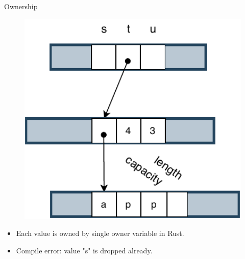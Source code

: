 \documentclass[9pt]{beamer}
\begin{document}
\begin{frame}[t, fragile]{Ownership}
\begin{minipage}{0.3\linewidth}
\begin{figure}[hp]
            \end{figure}
        \end{minipage}     
        \begin{minipage}{0.3\linewidth}
            \begin{figure}[hp]
                \centering
                \begin{center}
                        \includegraphics[width=1.0\textwidth]{images/owner2.pdf}
                        \captionsetup{labelformat=empty}
                \end{center}
                
            \end{figure}
        \end{minipage}
                

        \vspace{0.5cm}
        \begin{itemize}
            \item Each value is owned by single owner variable in Rust.
            \item Compile error: value "s" is dropped already.
        \end{itemize}

 \end{frame}
\end{document}
